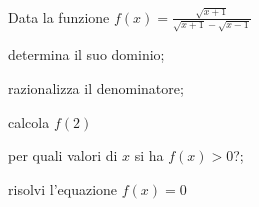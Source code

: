 \begin{esercizio}%
Data la funzione \(f(x)=\frac{\sqrt{x+1}}{\sqrt{x+1}-\sqrt{x-1}}\)
\begin{multicols}{2}
 \begin{enumeratea}
 \item determina il suo dominio;
 \item razionalizza il denominatore;
 \item calcola \(f(2)\)
 \item per quali valori di \(x\) si ha \(f(x)>0\)?;
 \item risolvi l'equazione \(f(x)=0\)
 \end{enumeratea}
\end{multicols}
\end{esercizio}
